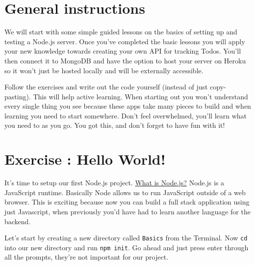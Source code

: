 \documentclass{42-en}
\begin{document}
\chapter{General instructions}

    We will start with some simple guided lessons on the basics of setting up 
and testing a Node.js server. Once you've completed the basic lessons you will 
apply your new knowledge towards creating your own API for tracking Todos. You’ll then connect it to MongoDB and have the option to host your server on Heroku so it won’t just be hosted locally and will be externally accessible.

Follow the exercises and write out the code yourself (instead of just copy-pasting). This will help active learning. When starting out you won’t understand every single thing you see because these apps take many pieces to build and when learning you need to start somewhere. Don't feel overwhelmed, you’ll learn what you need to as you go. You got this, and don't forget to have fun with it!

\startexercices


\chapter{Exercise \exercicenumber: Hello World!}

    It’s time to setup our first Node.js project. \href{https://codeburst.io/the-only-nodejs-introduction-youll-ever-need-d969a47ef219}{What is Node.js?} Node.js is a JavaScript runtime. Basically Node allows us to run JavaScript outside of a web browser. This is exciting because now you can build a full stack application using just Javascript, when previously you’d have had to learn another language for the backend.

	Let's start by creating a new directory called \texttt{Basics} from the Terminal. Now \texttt{cd} into our new directory and run \texttt{npm init}. Go ahead and just press enter through all the prompts, they're not important for our project.
\end{document}
